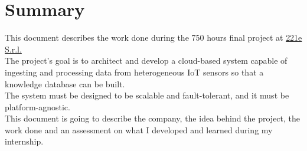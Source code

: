 \cleardoublepage
{}
{}
\begingroup
\let\clearpage\relax
\let\cleardoublepage\relax
\let\cleardoublepage\relax

\chapter*{Summary}

This document describes the work done during the 750 hours final project at \href{https://www.221e.com/about-us}{221e S.r.l.}\\
The project's goal is to architect and develop a cloud-based system capable of ingesting and processing data from heterogeneous IoT sensors so that a knowledge database can be built.\\
The system must be designed to be scalable and fault-tolerant, and it must be platform-agnostic.\\
This document is going to describe the company, the idea behind the project, the work done and an assessment on what I developed and learned during my internship.\\




\endgroup

\vfill
